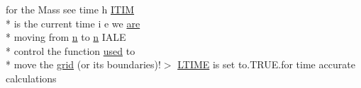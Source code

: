\begin{DoxyCompactItemize}
for the Mass see time h \hyperlink{time_8com_a05b1a0581c155d7e49853c3808fe94c9}{I\-T\-I\-M} \\*
is the current time i e we \hyperlink{ibc8_8com_a7f7721a0bb3c1d35cfbfbcfd6efc1548}{are} \\*
moving from \hyperlink{time_8com_a59787df2891338b611ba3a1096154aa3}{n} to \hyperlink{time_8com_a59787df2891338b611ba3a1096154aa3}{n} I\-A\-L\-E \\*
control the function \hyperlink{streamplasma_8com_ae33ecc71599b4338146f31d68e60c328}{used} to \\*
move the \hyperlink{time_8com_a088185b59a6d10b819bbe2c5bb211c09}{grid} (or its boundaries)!$>$ \hyperlink{time_8com_a5194e009f554c771a956f03d9c6b3acd}{L\-T\-I\-M\-E} is set to.\-T\-R\-U\-E.\-for time accurate calculations
\end{DoxyCompactItemize}
